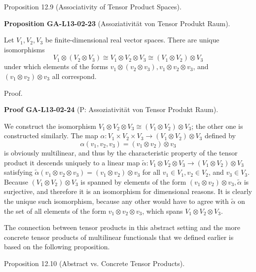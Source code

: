 \documentclass[10pt, letterpaper]{article}
\newcommand{\CustomHeading}[3]{%
  \par\medskip\noindent%
  \textbf{#1 #2} \textnormal{(#3)}.\enskip%
}
\newenvironment{PROP}[2]{\begin{unitbox}\CustomHeading{Proposition}{#1}{#2}}{\end{unitbox}}
\newenvironment{PROOF}[2]{\begin{unitbox}\CustomHeading{Proof}{#1}{#2}}{\end{unitbox}}
\begin{document}
Proposition 12.9 (Associativity of Tensor Product Spaces). 



\begin{PROP}{GA-L13-02-23}{Assoziativität von Tensor Produkt Raum}
Let $V_{1}, V_{2}, V_{3}$ be finite-dimensional real vector spaces. There are unique isomorphisms
$$
V_{1} \otimes\left(V_{2} \otimes V_{3}\right) \cong V_{1} \otimes V_{2} \otimes V_{3} \cong\left(V_{1} \otimes V_{2}\right) \otimes V_{3}
$$
under which elements of the forms $v_{1} \otimes\left(v_{2} \otimes v_{3}\right), v_{1} \otimes v_{2} \otimes v_{3}$, and $\left(v_{1} \otimes v_{2}\right) \otimes v_{3}$ all correspond.
\end{PROP}



Proof. 

\begin{PROOF}{GA-L13-02-24}{P: Assoziativität von Tensor Produkt Raum}
We construct the isomorphism $V_{1} \otimes V_{2} \otimes V_{3} \cong\left(V_{1} \otimes V_{2}\right) \otimes V_{3}$; the other one is constructed similarly. The map $\alpha: V_{1} \times V_{2} \times V_{3} \rightarrow\left(V_{1} \otimes V_{2}\right) \otimes V_{3}$ defined by
$$
\alpha\left(v_{1}, v_{2}, v_{3}\right)=\left(v_{1} \otimes v_{2}\right) \otimes v_{3}
$$
is obviously multilinear, and thus by the characteristic property of the tensor product it descends uniquely to a linear map $\widetilde{\alpha}: V_{1} \otimes V_{2} \otimes V_{3} \rightarrow\left(V_{1} \otimes V_{2}\right) \otimes V_{3}$ satisfying $\widetilde{\alpha}\left(v_{1} \otimes v_{2} \otimes v_{3}\right)=\left(v_{1} \otimes v_{2}\right) \otimes v_{3}$ for all $v_{1} \in V_{1}, v_{2} \in V_{2}$, and $v_{3} \in V_{3}$. Because $\left(V_{1} \otimes V_{2}\right) \otimes V_{3}$ is spanned by elements of the form $\left(v_{1} \otimes v_{2}\right) \otimes v_{3}, \tilde{\alpha}$ is surjective, and therefore it is an isomorphism for dimensional reasons. It is clearly the unique such isomorphism, because any other would have to agree with $\tilde{\alpha}$ on the set of all elements of the form $v_{1} \otimes v_{2} \otimes v_{3}$, which spans $V_{1} \otimes V_{2} \otimes V_{3}$.
\end{PROOF}


The connection between tensor products in this abstract setting and the more concrete tensor products of multilinear functionals that we defined earlier is based on the following proposition.

Proposition 12.10 (Abstract vs. Concrete Tensor Products). 
\end{document}
